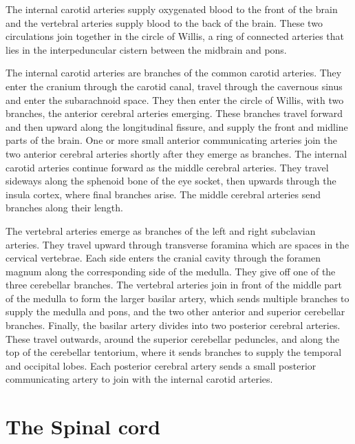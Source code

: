 The internal carotid arteries supply oxygenated blood to the front of the brain and the vertebral arteries supply blood to the back of the brain. These two circulations join together in the circle of Willis, a ring of connected arteries that lies in the interpeduncular cistern between the midbrain and pons.

The internal carotid arteries are branches of the common carotid arteries. They enter the cranium through the carotid canal, travel through the cavernous sinus and enter the subarachnoid space. They then enter the circle of Willis, with two branches, the anterior cerebral arteries emerging. These branches travel forward and then upward along the longitudinal fissure, and supply the front and midline parts of the brain. One or more small anterior communicating arteries join the two anterior cerebral arteries shortly after they emerge as branches. The internal carotid arteries continue forward as the middle cerebral arteries. They travel sideways along the sphenoid bone of the eye socket, then upwards through the insula cortex, where final branches arise. The middle cerebral arteries send branches along their length.

The vertebral arteries emerge as branches of the left and right subclavian arteries. They travel upward through transverse foramina which are spaces in the cervical vertebrae. Each side enters the cranial cavity through the foramen magnum along the corresponding side of the medulla. They give off one of the three cerebellar branches. The vertebral arteries join in front of the middle part of the medulla to form the larger basilar artery, which sends multiple branches to supply the medulla and pons, and the two other anterior and superior cerebellar branches. Finally, the basilar artery divides into two posterior cerebral arteries. These travel outwards, around the superior cerebellar peduncles, and along the top of the cerebellar tentorium, where it sends branches to supply the temporal and occipital lobes. Each posterior cerebral artery sends a small posterior communicating artery to join with the internal carotid arteries.

\hypertarget{the-spinal-cord}{%
\section{The Spinal cord}\label{the-spinal-cord}}

